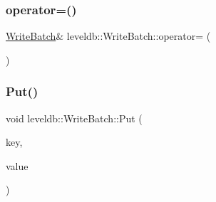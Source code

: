 \subsubsection{\texorpdfstring{operator=()}{operator=()}}
{\footnotesize\ttfamily \mbox{\hyperlink{classleveldb_1_1_write_batch}{Write\+Batch}}\& leveldb\+::\+Write\+Batch\+::operator= (\begin{DoxyParamCaption}\item[{const \mbox{\hyperlink{classleveldb_1_1_write_batch}{Write\+Batch}} \&}]{ }\end{DoxyParamCaption})\hspace{0.3cm}{\ttfamily [default]}}

\mbox{\label{classleveldb_1_1_write_batch_a30770379143a7ccb4ede18ddf0e45bf3}} 
\subsubsection{\texorpdfstring{Put()}{Put()}}
{\footnotesize\ttfamily void leveldb\+::\+Write\+Batch\+::\+Put (\begin{DoxyParamCaption}\item[{const \mbox{\hyperlink{classleveldb_1_1_slice}{Slice}} \&}]{key,  }\item[{const \mbox{\hyperlink{classleveldb_1_1_slice}{Slice}} \&}]{value }\end{DoxyParamCaption})}

